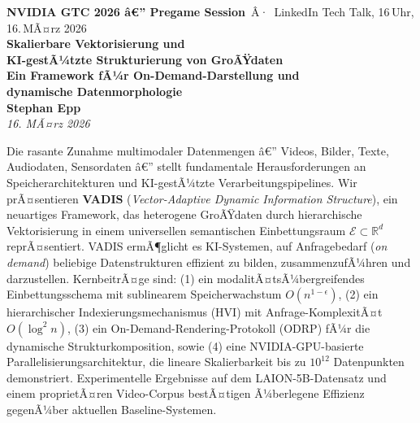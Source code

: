 ﻿\documentclass[12pt,a4paper]{article}
\begin{document}
\begin{center}
  \vspace*{0.2cm}
  {\small\textcolor{nvidiaGreen}{\textbf{NVIDIA GTC 2026 â€” Pregame Session}} \,Â·\,
   LinkedIn Tech Talk, 16\,Uhr, 16.\,MÃ¤rz 2026}\\[0.5em]

  {\LARGE\bfseries\color{nvidiaDark}
   Skalierbare Vektorisierung und \\KI-gestÃ¼tzte Strukturierung von GroÃŸdaten}\\[0.3em]
  {\Large\bfseries\color{accentBlue}
   Ein Framework fÃ¼r On-Demand-Darstellung und\\[0.1em]
   dynamische Datenmorphologie}\\[0.7em]

  {\normalsize\bfseries Stephan Epp}\\[0.4em]
  {\small\textit{16. MÃ¤rz 2026}}\\[0.8em]

  \begin{minipage}{0.88\linewidth}
    \begin{tcolorbox}[mybox, title={Abstract}]
      \small
      Die rasante Zunahme multimodaler Datenmengen â€” Videos, Bilder, Texte, 
      Audiodaten, Sensordaten â€” stellt fundamentale Herausforderungen an 
      Speicherarchitekturen und KI-gestÃ¼tzte Verarbeitungspipelines.
      Wir prÃ¤sentieren \textbf{VADIS} (\textit{Vector-Adaptive Dynamic 
      Information Structure}), ein neuartiges Framework, das heterogene 
      GroÃŸdaten durch hierarchische Vektorisierung in einem universellen 
      semantischen Einbettungsraum $\mathcal{E} \subset \mathbb{R}^d$ 
      reprÃ¤sentiert. VADIS ermÃ¶glicht es KI-Systemen, auf Anfragebedarf 
      (\textit{on demand}) beliebige Datenstrukturen effizient zu bilden, 
      zusammenzufÃ¼hren und darzustellen. KernbeitrÃ¤ge sind: (1) ein 
      modalitÃ¤tsÃ¼bergreifendes Einbettungsschema mit sublinearem 
      Speicherwachstum $O(n^{1-\epsilon})$, (2) ein hierarchischer 
      Indexierungsmechanismus (HVI) mit Anfrage-KomplexitÃ¤t 
      $O(\log^2 n)$, (3) ein On-Demand-Rendering-Protokoll (ODRP) fÃ¼r 
      die dynamische Strukturkomposition, sowie (4) eine NVIDIA-GPU-basierte 
      Parallelisierungsarchitektur, die lineare Skalierbarkeit bis zu 
      $10^{12}$ Datenpunkten demonstriert. Experimentelle Ergebnisse auf 
      dem LAION-5B-Datensatz und einem proprietÃ¤ren Video-Corpus 
      bestÃ¤tigen Ã¼berlegene Effizienz gegenÃ¼ber aktuellen Baseline-Systemen.
    \end{tcolorbox}
  \end{minipage}\\[0.9em]
\end{center}
\end{document}
